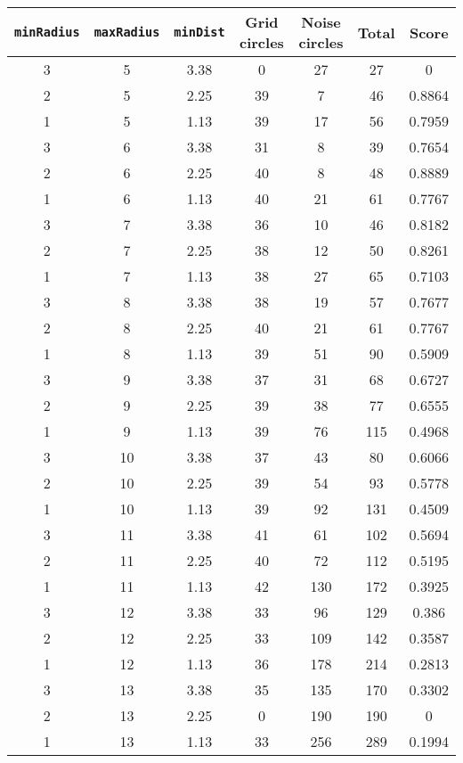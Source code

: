 \documentclass[letterpaper, 12pt]{article}
\begin{document}
\begin{longtable}{|c|c|c|c|c|c|c|}
\hline
\textbf{\texttt{minRadius}} & \textbf{\texttt{maxRadius}} & \textbf{\texttt{minDist}} & \textbf{Grid circles} & \textbf{Noise circles} & \textbf{Total} & \textbf{Score} \\
\hline
3 & 5 & 3.38 & 0 & 27 & 27 & 0 \\
\hline
2 & 5 & 2.25 & 39 & 7 & 46 & 0.8864 \\
\hline
1 & 5 & 1.13 & 39 & 17 & 56 & 0.7959 \\
\hline
3 & 6 & 3.38 & 31 & 8 & 39 & 0.7654 \\
\hline
2 & 6 & 2.25 & 40 & 8 & 48 & 0.8889 \\
\hline
1 & 6 & 1.13 & 40 & 21 & 61 & 0.7767 \\
\hline
3 & 7 & 3.38 & 36 & 10 & 46 & 0.8182 \\
\hline
2 & 7 & 2.25 & 38 & 12 & 50 & 0.8261 \\
\hline
1 & 7 & 1.13 & 38 & 27 & 65 & 0.7103 \\
\hline
3 & 8 & 3.38 & 38 & 19 & 57 & 0.7677 \\
\hline
2 & 8 & 2.25 & 40 & 21 & 61 & 0.7767 \\
\hline
1 & 8 & 1.13 & 39 & 51 & 90 & 0.5909 \\
\hline
3 & 9 & 3.38 & 37 & 31 & 68 & 0.6727 \\
\hline
2 & 9 & 2.25 & 39 & 38 & 77 & 0.6555 \\
\hline
1 & 9 & 1.13 & 39 & 76 & 115 & 0.4968 \\
\hline
3 & 10 & 3.38 & 37 & 43 & 80 & 0.6066 \\
\hline
2 & 10 & 2.25 & 39 & 54 & 93 & 0.5778 \\
\hline
1 & 10 & 1.13 & 39 & 92 & 131 & 0.4509 \\
\hline
3 & 11 & 3.38 & 41 & 61 & 102 & 0.5694 \\
\hline
2 & 11 & 2.25 & 40 & 72 & 112 & 0.5195 \\
\hline
1 & 11 & 1.13 & 42 & 130 & 172 & 0.3925 \\
\hline
3 & 12 & 3.38 & 33 & 96 & 129 & 0.386 \\
\hline
2 & 12 & 2.25 & 33 & 109 & 142 & 0.3587 \\
\hline
1 & 12 & 1.13 & 36 & 178 & 214 & 0.2813 \\
\hline
3 & 13 & 3.38 & 35 & 135 & 170 & 0.3302 \\
\hline
2 & 13 & 2.25 & 0 & 190 & 190 & 0 \\
\hline
1 & 13 & 1.13 & 33 & 256 & 289 & 0.1994 \\

\end{longtable}
\end{document}
